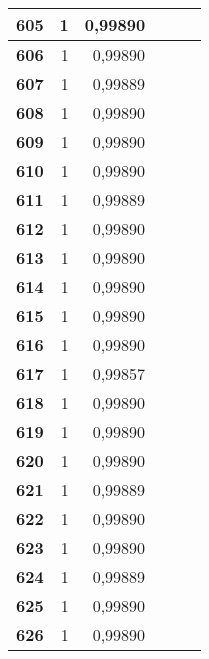 \begin{longtable}{|r|r|r|l|r|r|}
\textbf{605} & 1 & 0,99890 &  & \multicolumn{1}{l|}{} & \multicolumn{1}{l|}{} \\ \hline
\textbf{606} & 1 & 0,99890 &  & \multicolumn{1}{l|}{} & \multicolumn{1}{l|}{} \\ \hline
\textbf{607} & 1 & 0,99889 &  & \multicolumn{1}{l|}{} & \multicolumn{1}{l|}{} \\ \hline
\textbf{608} & 1 & 0,99890 &  & \multicolumn{1}{l|}{} & \multicolumn{1}{l|}{} \\ \hline
\textbf{609} & 1 & 0,99890 &  & \multicolumn{1}{l|}{} & \multicolumn{1}{l|}{} \\ \hline
\textbf{610} & 1 & 0,99890 &  & \multicolumn{1}{l|}{} & \multicolumn{1}{l|}{} \\ \hline
\textbf{611} & 1 & 0,99889 &  & \multicolumn{1}{l|}{} & \multicolumn{1}{l|}{} \\ \hline
\textbf{612} & 1 & 0,99890 &  & \multicolumn{1}{l|}{} & \multicolumn{1}{l|}{} \\ \hline
\textbf{613} & 1 & 0,99890 &  & \multicolumn{1}{l|}{} & \multicolumn{1}{l|}{} \\ \hline
\textbf{614} & 1 & 0,99890 &  & \multicolumn{1}{l|}{} & \multicolumn{1}{l|}{} \\ \hline
\textbf{615} & 1 & 0,99890 &  & \multicolumn{1}{l|}{} & \multicolumn{1}{l|}{} \\ \hline
\textbf{616} & 1 & 0,99890 &  & \multicolumn{1}{l|}{} & \multicolumn{1}{l|}{} \\ \hline
\textbf{617} & 1 & 0,99857 &  & \multicolumn{1}{l|}{} & \multicolumn{1}{l|}{} \\ \hline
\textbf{618} & 1 & 0,99890 &  & \multicolumn{1}{l|}{} & \multicolumn{1}{l|}{} \\ \hline
\textbf{619} & 1 & 0,99890 &  & \multicolumn{1}{l|}{} & \multicolumn{1}{l|}{} \\ \hline
\textbf{620} & 1 & 0,99890 &  & \multicolumn{1}{l|}{} & \multicolumn{1}{l|}{} \\ \hline
\textbf{621} & 1 & 0,99889 &  & \multicolumn{1}{l|}{} & \multicolumn{1}{l|}{} \\ \hline
\textbf{622} & 1 & 0,99890 &  & \multicolumn{1}{l|}{} & \multicolumn{1}{l|}{} \\ \hline
\textbf{623} & 1 & 0,99890 &  & \multicolumn{1}{l|}{} & \multicolumn{1}{l|}{} \\ \hline
\textbf{624} & 1 & 0,99889 &  & \multicolumn{1}{l|}{} & \multicolumn{1}{l|}{} \\ \hline
\textbf{625} & 1 & 0,99890 &  & \multicolumn{1}{l|}{} & \multicolumn{1}{l|}{} \\ \hline
\textbf{626} & 1 & 0,99890 &  & \multicolumn{1}{l|}{} & \multicolumn{1}{l|}{} \\ \hline
\end{longtable}

